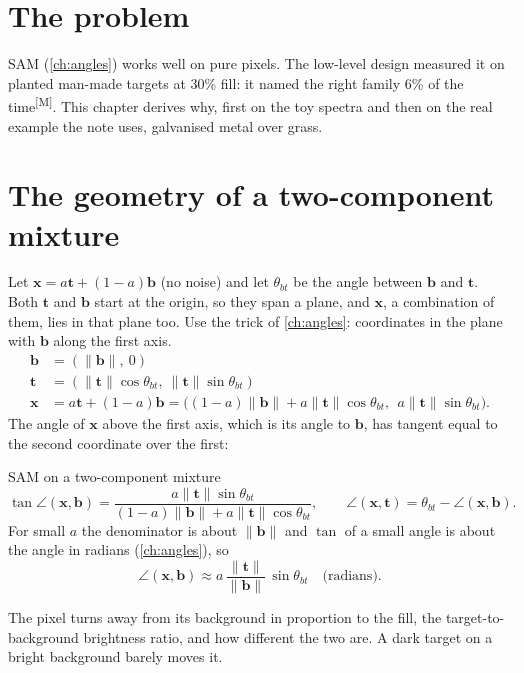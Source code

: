 \documentclass[11pt,a4paper,oneside,openany]{book}
\newcommand{\B}[1]{{\symbf{#1}}}
\newcommand{\B}[1]{{\bm{#1}}}
\newcommand{\meas}{\textsuperscript{\textsf{\scriptsize[M]}}}
\newcommand{\nrm}[1]{\lVert #1\rVert}
\newcommand{\vx}{\B{x}}
\newcommand{\vt}{\B{t}}
\newcommand{\vb}{\B{b}}
\begin{document}
\section{The problem}

SAM (\cref{ch:angles}) works well on pure pixels. The low-level design measured it on planted man-made targets at 30\% fill: it named the right family
6\% of the time\meas. This chapter derives why, first on the toy spectra and then on the real example the note uses, galvanised metal over grass.

\section{The geometry of a two-component mixture}

Let $\vx=a\vt+(1-a)\vb$ (no noise) and let $\theta_{bt}$ be the angle between $\vb$ and $\vt$. Both $\vt$ and $\vb$ start at the origin, so they span a
plane, and $\vx$, a combination of them, lies in that plane too. Use the trick of \cref{ch:angles}: coordinates in the plane with $\vb$ along the first
axis.
\begin{align*}
\vb &= (\nrm{\vb},\ 0)\\
\vt &= (\nrm{\vt}\cos\theta_{bt},\ \nrm{\vt}\sin\theta_{bt})\\
\vx &= a\vt+(1-a)\vb=\big((1-a)\nrm{\vb}+a\nrm{\vt}\cos\theta_{bt},\ \ a\nrm{\vt}\sin\theta_{bt}\big) .
\end{align*}
The angle of $\vx$ above the first axis, which is its angle to $\vb$, has tangent equal to the second coordinate over the first:

\begin{rulebox}[label=rule:sam]{SAM on a two-component mixture}
\[
  \tan\angle(\vx,\vb)=\frac{a\nrm{\vt}\sin\theta_{bt}}{(1-a)\nrm{\vb}+a\nrm{\vt}\cos\theta_{bt}},\qquad
  \angle(\vx,\vt)=\theta_{bt}-\angle(\vx,\vb).
\]
For small $a$ the denominator is about $\nrm{\vb}$ and $\tan$ of a small angle is about the angle in radians (\cref{ch:angles}), so
\[
  \angle(\vx,\vb)\approx a\,\frac{\nrm{\vt}}{\nrm{\vb}}\,\sin\theta_{bt}\quad\text{(radians)}.
\]
\end{rulebox}

The pixel turns away from its background in proportion to the fill, the target-to-background brightness ratio, and how different the two are. A dark
target on a bright background barely moves it.
\end{document}
